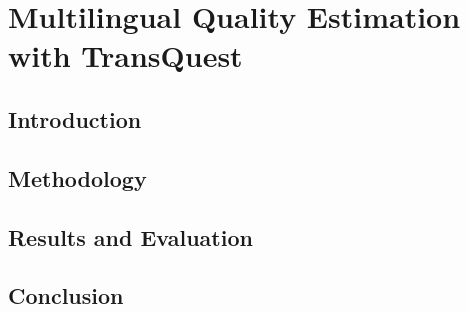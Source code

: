 \chapter{\label{cha:multilingual}Multilingual Quality Estimation with TransQuest}

\section{Introduction}
\cite{sun-etal-2020-exploratory}

\section{Methodology}

\section{Results and Evaluation}

\section{Conclusion}